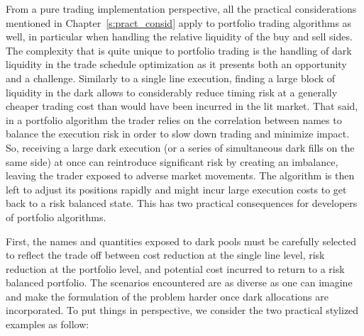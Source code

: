 From a pure trading implementation perspective, all the practical considerations mentioned in Chapter~\ref{s:pract_consid} apply to portfolio trading algorithms as well, in particular when handling the relative liquidity of the buy and sell sides. The complexity that is quite unique to portfolio trading is the handling of dark liquidity in the trade schedule optimization as it presents both an opportunity and a challenge. Similarly to a single line execution, finding a large block of liquidity in the dark allows to considerably reduce timing risk at a generally cheaper trading cost than would have been incurred in the lit market. That said, in a portfolio algorithm the trader relies on the correlation between names to balance the execution risk in order to slow down trading and minimize impact. So, receiving a large dark execution (or a series of simultaneous dark fills on the same side) at once can reintroduce significant risk by creating an imbalance, leaving the trader exposed to adverse market movements. The algorithm is then left to adjust its positions rapidly and might incur large execution costs to get back to a risk balanced state. This has two practical consequences for developers of portfolio algorithms. 


First, the names and quantities exposed to dark pools must be carefully selected to reflect the trade off between cost reduction at the single line level, risk reduction at the portfolio level, and potential cost incurred to return to a risk balanced portfolio. The scenarios encountered are as diverse as one can imagine and make the formulation of the problem harder once dark allocations are incorporated. To put things in perspective, we consider the two practical stylized examples as follow:


